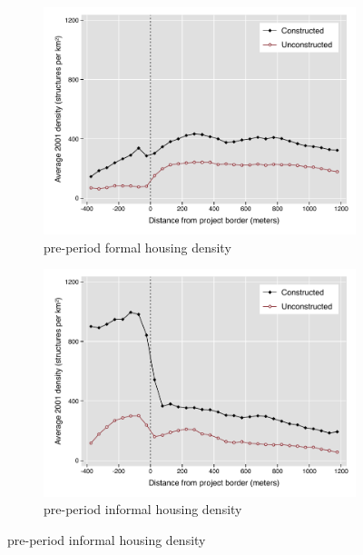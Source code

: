 \documentclass[12pt]{article}
\begin{document}
\pagebreak

\begin{figure}
        \centering
        \caption[ Pre-Period Housing Densities in Constructed and Unconstructed Projects Areas ]
        {\small Pre-Period Housing Densities in Constructed and Unconstructed projects } 
        \begin{subfigure}[b]{0.495\textwidth}
            \centering
            \includegraphics[width=\textwidth,trim={0.3cm .3cm 0.1cm 0cm}, clip=true]{figures/bblu_for_pre_means_4.pdf}
            \caption[Network2]%
            {{\small pre-period formal housing density}}    
            \label{fig:prefor}
        \end{subfigure}
        \hfill
        \begin{subfigure}[b]{0.495\textwidth}  
            \centering 
            \includegraphics[width=\textwidth,trim={0.3cm .3cm 0.1cm 0cm}, clip=true]{figures/bblu_inf_pre_means_4.pdf}
            \caption[]%
            {{\small pre-period informal housing density}}    
            \label{fig:preinf}
        \end{subfigure}
        \label{fig:rawbblumeans}
        \vspace{-6mm}
    \end{figure} 
\end{document}
